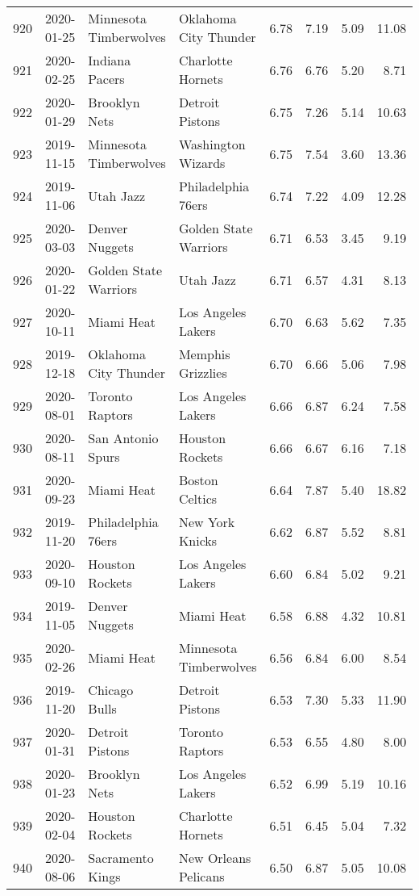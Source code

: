 \documentclass[
  11pt,
]{article}
\theoremstyle{nonumberplain}
\begin{document}
\begin{longtable}{rl|llr|rrr}
920 & 2020-01-25 & Minnesota Timberwolves & Oklahoma City Thunder & 6.78 & 7.19 & 5.09 & 11.08\\
921 & 2020-02-25 & Indiana Pacers & Charlotte Hornets & 6.76 & 6.76 & 5.20 & 8.71\\
922 & 2020-01-29 & Brooklyn Nets & Detroit Pistons & 6.75 & 7.26 & 5.14 & 10.63\\
923 & 2019-11-15 & Minnesota Timberwolves & Washington Wizards & 6.75 & 7.54 & 3.60 & 13.36\\
924 & 2019-11-06 & Utah Jazz & Philadelphia 76ers & 6.74 & 7.22 & 4.09 & 12.28\\
925 & 2020-03-03 & Denver Nuggets & Golden State Warriors & 6.71 & 6.53 & 3.45 & 9.19\\
926 & 2020-01-22 & Golden State Warriors & Utah Jazz & 6.71 & 6.57 & 4.31 & 8.13\\
927 & 2020-10-11 & Miami Heat & Los Angeles Lakers & 6.70 & 6.63 & 5.62 & 7.35\\
928 & 2019-12-18 & Oklahoma City Thunder & Memphis Grizzlies & 6.70 & 6.66 & 5.06 & 7.98\\
929 & 2020-08-01 & Toronto Raptors & Los Angeles Lakers & 6.66 & 6.87 & 6.24 & 7.58\\
930 & 2020-08-11 & San Antonio Spurs & Houston Rockets & 6.66 & 6.67 & 6.16 & 7.18\\
931 & 2020-09-23 & Miami Heat & Boston Celtics & 6.64 & 7.87 & 5.40 & 18.82\\
932 & 2019-11-20 & Philadelphia 76ers & New York Knicks & 6.62 & 6.87 & 5.52 & 8.81\\
933 & 2020-09-10 & Houston Rockets & Los Angeles Lakers & 6.60 & 6.84 & 5.02 & 9.21\\
934 & 2019-11-05 & Denver Nuggets & Miami Heat & 6.58 & 6.88 & 4.32 & 10.81\\
935 & 2020-02-26 & Miami Heat & Minnesota Timberwolves & 6.56 & 6.84 & 6.00 & 8.54\\
936 & 2019-11-20 & Chicago Bulls & Detroit Pistons & 6.53 & 7.30 & 5.33 & 11.90\\
937 & 2020-01-31 & Detroit Pistons & Toronto Raptors & 6.53 & 6.55 & 4.80 & 8.00\\
938 & 2020-01-23 & Brooklyn Nets & Los Angeles Lakers & 6.52 & 6.99 & 5.19 & 10.16\\
939 & 2020-02-04 & Houston Rockets & Charlotte Hornets & 6.51 & 6.45 & 5.04 & 7.32\\
940 & 2020-08-06 & Sacramento Kings & New Orleans Pelicans & 6.50 & 6.87 & 5.05 & 10.08\\

\end{longtable}
\end{document}
